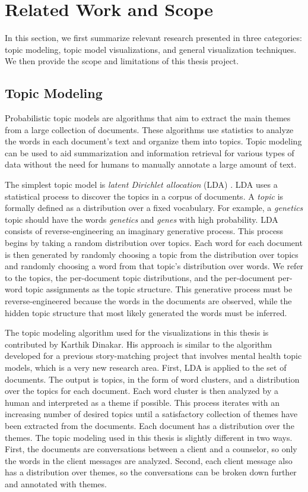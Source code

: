 \chapter{Related Work and Scope}

In this section, we first summarize relevant research presented in three categories: topic modeling, topic model visualizations, and general visualization techniques. We then provide the scope and limitations of this thesis project.

\section{Topic Modeling}

Probabilistic topic models \cite{blei-topicmodel} are algorithms that aim to extract the main themes from a large collection of documents. These algorithms use statistics to analyze the words in each document's text and organize them into topics. Topic modeling can be used to aid summarization and information retrieval for various types of data without the need for humans to manually annotate a large amount of text.

The simplest topic model is \textit{latent Dirichlet allocation} (LDA) \cite{blei-topicmodel}. LDA uses a statistical process to discover the topics in a corpus of documents. A \textit{topic} is formally defined as a distribution over a fixed vocabulary. For example, a \textit{genetics} topic should have the words \textit{genetics} and \textit{genes} with high probability. LDA consists of reverse-engineering an imaginary generative process. This process begins by taking a random distribution over topics. Each word for each document is then generated by randomly choosing a topic from the distribution over topics and randomly choosing a word from that topic's distribution over words. We refer to the topics, the per-document topic distributions, and the per-document per-word topic assignments as the topic structure. This generative process must be reverse-engineered because the words in the documents are observed, while the hidden topic structure that most likely generated the words must be inferred.

The topic modeling algorithm used for the visualizations in this thesis is contributed by Karthik Dinakar. His approach is similar to the algorithm developed for a previous story-matching project \cite{dinakar-mtv} that involves mental health topic models, which is a very new research area. First, LDA is applied to the set of documents. The output is topics, in the form of word clusters, and a distribution over the topics for each document. Each word cluster is then analyzed by a human and interpreted as a theme if possible. This process iterates with an increasing number of desired topics until a satisfactory collection of themes have been extracted from the documents. Each document has a distribution over the themes. The topic modeling used in this thesis is slightly different in two ways. First, the documents are conversations between a client and a counselor, so only the words in the client messages are analyzed. Second, each client message also has a distribution over themes, so the conversations can be broken down further and annotated with themes.

